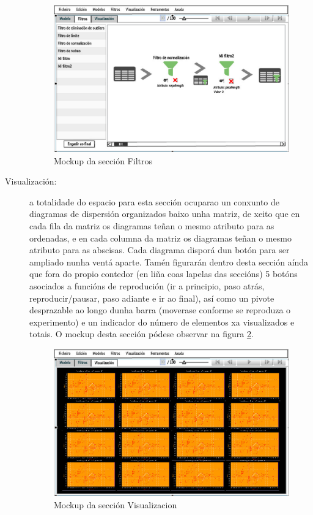 \begin{description}
\begin{figure}
\includegraphics[width=\textwidth,height=\textheight,keepaspectratio]{figuras/Filtros}
\caption{Mockup da sección Filtros}
\label{Filtros}
\end{figure}
\item[Visualización:] \hfill
a totalidade do espacio para esta sección ocuparao un conxunto de diagramas de dispersión organizados baixo unha matriz, de xeito que en cada fila da matriz os diagramas teñan o mesmo atributo para as ordenadas, e en cada columna da matriz os diagramas teñan o mesmo atributo para as abscisas. Cada diagrama disporá dun botón para ser ampliado nunha ventá aparte. Tamén figurarán dentro desta sección aínda que fora do propio contedor (en liña coas lapelas das seccións) 5 botóns asociados a funcións de reprodución (ir a principio, paso atrás, reproducir/pausar, paso adiante e ir ao final), así como un pivote desprazable ao longo dunha barra (moverase conforme se reproduza o experimento) e un indicador do número de elementos xa visualizados e totais. O mockup desta sección pódese observar na figura \ref{Visualizacion}.
\begin{figure}
\centering
\includegraphics[width=\textwidth,height=\textheight,keepaspectratio]{figuras/Visualizacion}
\caption{Mockup da sección Visualizacion}
\label{Visualizacion}
\end{figure}
\end{description} 

